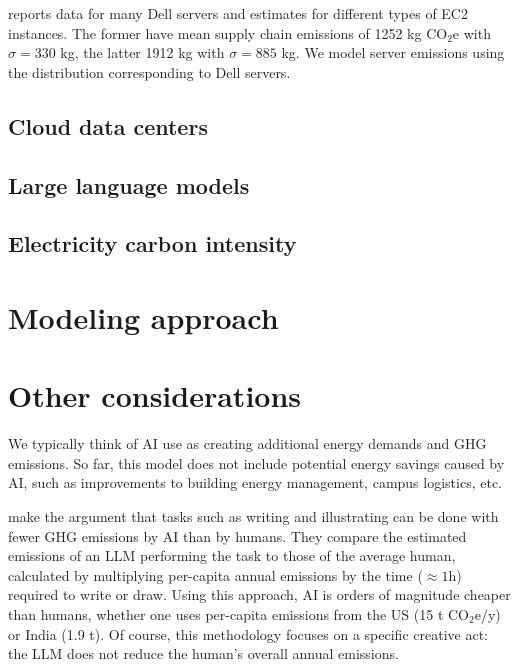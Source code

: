 \documentclass[11pt]{article}
\begin{document}
\textcite{davy2021} reports data for many Dell servers and estimates for different types of EC2 instances.
The former have mean supply chain emissions of 1252 kg CO$_2$e with $\sigma = 330$ kg, the latter
1912 kg with $\sigma = 885$ kg. We model server emissions using the distribution corresponding to Dell
servers.



\subsection*{Cloud data centers}

\subsection*{Large language models}

\subsection*{Electricity carbon intensity}

\cite{krebs2018umweltbilanz}

\section*{Modeling approach}

\section*{Other considerations}

We typically think of AI use as creating additional energy demands and GHG emissions.
So far, this model does not include potential energy savings caused by AI, such as improvements
to building energy management, campus logistics, etc.

\textcite{tomlinson2024carbon} make the argument that tasks such as writing
and illustrating can be done with fewer GHG emissions by AI than by humans. They compare the
estimated emissions of an LLM performing the task to those of the average human, calculated
by multiplying per-capita annual emissions by the time ($\approx 1$h) required to write or draw.
Using this approach, AI is orders of magnitude cheaper than humans, whether one uses per-capita
emissions from the US (15 t CO$_2$e/y) or India (1.9 t). Of course, this methodology focuses on
a specific creative act: the LLM does not reduce the human's overall annual emissions.

\printbibliography
\end{document}
